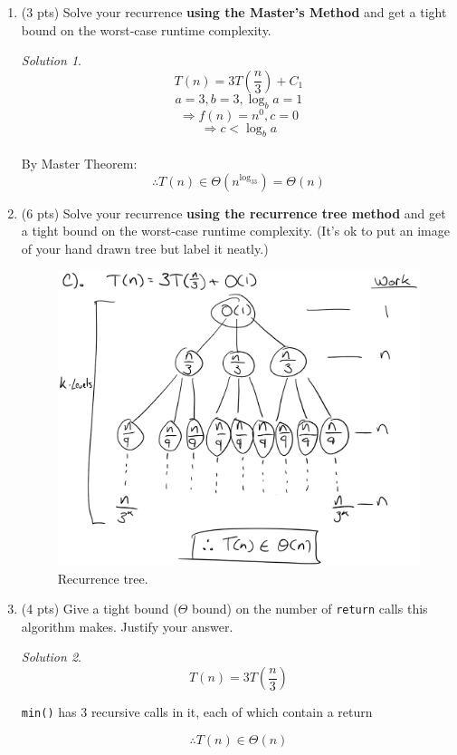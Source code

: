 \documentclass[12pt]{article}
\theoremstyle{remark}
\newtheorem*{solution}{Solution}
\begin{document}
\begin{enumerate}
\begin{enumerate}[label=(\alph*)]
\item (3 pts) Solve your recurrence \textbf{using the Master's Method} and get a tight bound on the worst-case runtime complexity.
\begin{solution}
$$T(n) = 3T(\frac{n}{3}) + C_1$$ $$a = 3, b=3, \log_ba = 1$$ $$\Rightarrow f(n) = n^0, c = 0$$ $$\Rightarrow c < \log_ba$$ \\ By Master Theorem: $$\therefore T(n) \in \Theta(n^{\log_33}) = \Theta(n)$$
\end{solution}
\pagebreak

\item (6 pts) Solve your recurrence \textbf{using the recurrence tree method} and get a tight bound on the worst-case runtime complexity. (It's ok to put an image of your hand drawn tree but label it neatly.)
\begin{figure}[h!]
  \includegraphics[width=\linewidth]{PS2b-Q6c.png}
  \caption{Recurrence tree.}
  \label{fig:recurrence tree}
\end{figure}
\pagebreak

\item (4 pts) Give a tight bound ($\Theta$ bound) on the number of {\tt return} calls this algorithm makes. Justify your answer.
\begin{solution}
$$T(n) = 3T(\frac{n}{3})$$ \begin{center} {\tt min()} has 3 recursive calls in it, each of which contain a return \end{center} $$\therefore T(n) \in \Theta(n)$$ 
\end{solution}
\pagebreak
\end{enumerate}


\end{enumerate}
\end{document}
